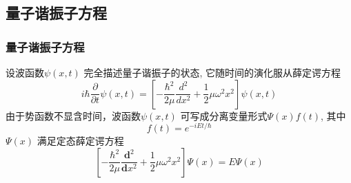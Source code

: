 \subsection{量子谐振子方程}
\begin{frame}
	\frametitle{量子谐振子方程}
	\解 设波函数$\psi(x,t)$ 完全描述量子谐振子的状态, 它随时间的演化服从薛定谔方程
	\begin{equation*}
		i\hbar \frac{\partial }{\partial t} \psi(x,t) =\left [ -\dfrac{\hbar^2}{2\mu } \frac{d^2 }{d x^2} + \dfrac{1}{2} \mu \omega ^2 x^2  \right ]\psi(x,t) 
	\end{equation*}
	由于势函数不显含时间，波函数$ \psi(x,t)$ 可写成分离变量形式$ \Psi(x)f(t)$, 其中
	$$f(t) = e^{-iEt/\hbar} $$  
	$ \Psi(x)$ 满足定态薛定谔方程
	\begin{equation*}
		\left [ -\frac{\hbar^2}{2\mu} \frac{\mathbf{d} ^2}{\mathbf{d} x^2} +\frac{1}{2}\mu \omega^2 x^2  \right ]\Psi(x)=E\Psi(x) 
	\end{equation*}	
\end{frame}


